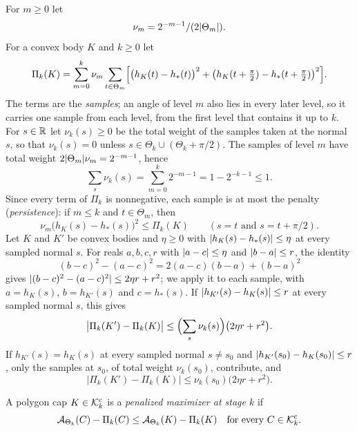 For $m\ge0$ let
\[
  \nu_m=2^{-m-1}/(2\lvert \Theta_m\rvert).
\]
For a convex body $K$ and $k\ge0$ let
\[
  \Pi_k(K)=\sum_{m=0}^k\nu_m\sum_{t\in\Theta_m}\Bigl[\bigl(h_K(t)-h_*(t)\bigr)^2
    +\bigl(h_K(t+\tfrac\pi2)-h_*(t+\tfrac\pi2)\bigr)^2\Bigr].
\]
The terms are the \emph{samples}; an angle of level $m$ also lies in every later
level, so it carries one sample from each level, from the first level that
contains it up to $k$. For $s\in\mathbb{R}$ let $\nu_k(s)\ge0$ be the total weight of
the samples taken at the normal $s$, so that $\nu_k(s)=0$ unless
$s\in\Theta_k\cup(\Theta_k+\pi/2)$. The samples of level $m$ have total weight
$2\lvert \Theta_m\rvert\nu_m=2^{-m-1}$, hence
\begin{equation}\label{eq:weights}
  \sum_s\nu_k(s)=\sum_{m=0}^k2^{-m-1}=1-2^{-k-1}\le1 .
\end{equation}
Since every term of $\Pi_k$ is nonnegative, each sample is at most the penalty
(\emph{persistence}): if $m\le k$ and $t\in\Theta_m$, then
\begin{equation}\label{eq:persistence}
  \nu_m\bigl(h_K(s)-h_*(s)\bigr)^2\le\Pi_k(K)\qquad(s=t\text{ and }s=t+\pi/2).
\end{equation}
Let $K$ and $K'$ be convex bodies and $\eta\ge0$ with
$\lvert h_K(s)-h_*(s)\rvert\le\eta$ at every sampled normal $s$. For reals $a,b,c,r$
with $\lvert a-c\rvert\le\eta$ and $\lvert b-a\rvert\le r$, the identity
\[
  (b-c)^2-(a-c)^2=2(a-c)(b-a)+(b-a)^2
\]
gives $\lvert (b-c)^2-(a-c)^2\rvert\le2\eta r+r^2$; we apply it to each sample, with
$a=h_K(s)$, $b=h_{K'}(s)$ and $c=h_*(s)$. If $\lvert h_{K'}(s)-h_K(s)\rvert\le r$ at
every sampled normal $s$, this gives
\begin{equation}\label{eq:penalty-change}
  \bigl\lvert\Pi_k(K')-\Pi_k(K)\bigr\rvert
    \le\Bigl(\sum_s\nu_k(s)\Bigr)\bigl(2\eta r+r^2\bigr).
\end{equation}
If $h_{K'}(s)=h_K(s)$ at every sampled normal $s\ne s_0$ and
$\lvert h_{K'}(s_0)-h_K(s_0)\rvert\le r$, only the samples at $s_0$, of total weight
$\nu_k(s_0)$, contribute, and
\begin{equation}\label{eq:penalty-change-one}
  \bigl\lvert\Pi_k(K')-\Pi_k(K)\bigr\rvert\le\nu_k(s_0)\bigl(2\eta r+r^2\bigr).
\end{equation}

\begin{definition}\label{def:penmax}
A polygon cap $K\in\mathcal{K}^{\mathrm{c}}_k$ is a \emph{penalized maximizer at stage $k$} if
\[
  \mathcal{A}_{\Theta_k}(C)-\Pi_k(C)\le\mathcal{A}_{\Theta_k}(K)-\Pi_k(K)
    \quad\text{for every }C\in\mathcal{K}^{\mathrm{c}}_k.
\]
\end{definition}

